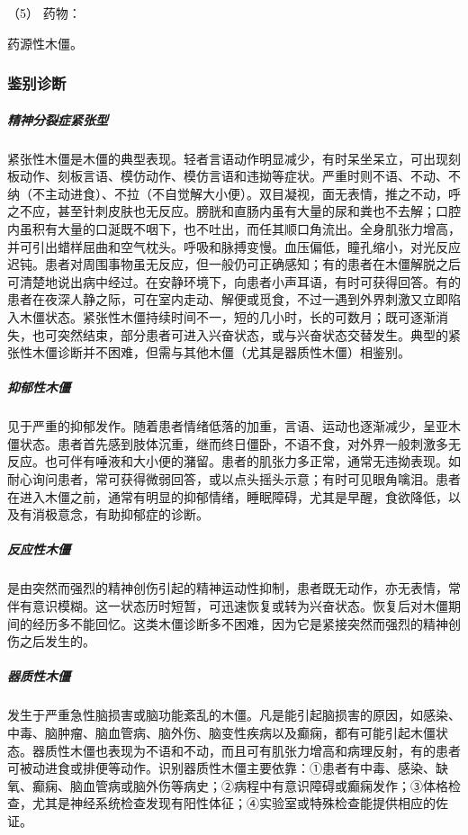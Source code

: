 \hypertarget{text00046.htmlux5cux23CHP1-18-4-1-2-5}{}
（5） 药物：

药源性木僵。

\subsubsection{鉴别诊断}

\subparagraph{精神分裂症紧张型}

紧张性木僵是木僵的典型表现。轻者言语动作明显减少，有时呆坐呆立，可出现刻板动作、刻板言语、模仿动作、模仿言语和违拗等症状。严重时则不语、不动、不纳（不主动进食）、不拉（不自觉解大小便）。双目凝视，面无表情，推之不动，呼之不应，甚至针刺皮肤也无反应。膀胱和直肠内虽有大量的尿和粪也不去解；口腔内虽积有大量的口涎既不咽下，也不吐出，而任其顺口角流出。全身肌张力增高，并可引出蜡样屈曲和空气枕头。呼吸和脉搏变慢。血压偏低，瞳孔缩小，对光反应迟钝。患者对周围事物虽无反应，但一般仍可正确感知；有的患者在木僵解脱之后可清楚地说出病中经过。在安静环境下，向患者小声耳语，有时可获得回答。有的患者在夜深人静之际，可在室内走动、解便或觅食，不过一遇到外界刺激又立即陷入木僵状态。紧张性木僵持续时间不一，短的几小时，长的可数月；既可逐渐消失，也可突然结束，部分患者可进入兴奋状态，或与兴奋状态交替发生。典型的紧张性木僵诊断并不困难，但需与其他木僵（尤其是器质性木僵）相鉴别。

\subparagraph{抑郁性木僵}

见于严重的抑郁发作。随着患者情绪低落的加重，言语、运动也逐渐减少，呈亚木僵状态。患者首先感到肢体沉重，继而终日僵卧，不语不食，对外界一般刺激多无反应。也可伴有唾液和大小便的潴留。患者的肌张力多正常，通常无违拗表现。如耐心询问患者，常可获得微弱回答，或以点头摇头示意；有时可见眼角噙泪。患者在进入木僵之前，通常有明显的抑郁情绪，睡眠障碍，尤其是早醒，食欲降低，以及有消极意念，有助抑郁症的诊断。

\subparagraph{反应性木僵}

是由突然而强烈的精神创伤引起的精神运动性抑制，患者既无动作，亦无表情，常伴有意识模糊。这一状态历时短暂，可迅速恢复或转为兴奋状态。恢复后对木僵期间的经历多不能回忆。这类木僵诊断多不困难，因为它是紧接突然而强烈的精神创伤之后发生的。

\subparagraph{器质性木僵}

发生于严重急性脑损害或脑功能紊乱的木僵。凡是能引起脑损害的原因，如感染、中毒、脑肿瘤、脑血管病、脑外伤、脑变性疾病以及癫痫，都有可能引起木僵状态。器质性木僵也表现为不语和不动，而且可有肌张力增高和病理反射，有的患者可被动进食或排便等动作。识别器质性木僵主要依靠：①患者有中毒、感染、缺氧、癫痫、脑血管病或脑外伤等病史；②病程中有意识障碍或癫痫发作；③体格检查，尤其是神经系统检查发现有阳性体征；④实验室或特殊检查能提供相应的佐证。

